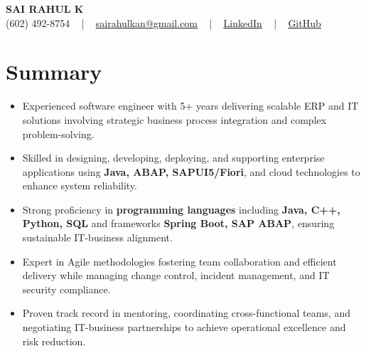\documentclass[letterpaper,11pt]{article}
\newcommand{\resumeItem}[1]{
  \item\footnotesize{
    {#1 \vspace{-2pt}}
  }
}
\newcommand{\resumeItemListStart}{\begin{itemize}[leftmargin=*]}
\newcommand{\resumeItemListEnd}{\end{itemize}\vspace{-5pt}}
\begin{document}
\begin{center}
    {\fontsize{14pt}{12pt}\selectfont \textbf{\MakeUppercase{Sai Rahul K}}}\\ \vspace{2pt}
    \fontsize{10pt}{12pt}\selectfont (602) 492-8754 ~ | ~ \href{mailto:sairahulkan@gmail.com}{sairahulkan@gmail.com} ~ | ~
    \href{https://www.linkedin.com/in/rq123/}{\color{blue}\underline{LinkedIn}} ~ | ~
    \href{https://github.com/kanrahuldo}{\color{blue}\underline{GitHub}}~
    \vspace{-8pt}
\end{center}

\section{Summary}
\fontsize{9pt}{10pt}\selectfont
\resumeItemListStart
    \resumeItem{Experienced software engineer with 5+ years delivering scalable ERP and IT solutions involving strategic business process integration and complex problem-solving.}
    \resumeItem{Skilled in designing, developing, deploying, and supporting enterprise applications using \textbf{Java, ABAP, SAPUI5/Fiori}, and cloud technologies to enhance system reliability.}
    \resumeItem{Strong proficiency in \textbf{programming languages} including \textbf{Java, C++, Python, SQL} and frameworks \textbf{Spring Boot, SAP ABAP}, ensuring sustainable IT-business alignment.}
    \resumeItem{Expert in Agile methodologies fostering team collaboration and efficient delivery while managing change control, incident management, and IT security compliance.}
    \resumeItem{Proven track record in mentoring, coordinating cross-functional teams, and negotiating IT-business partnerships to achieve operational excellence and risk reduction.}
\resumeItemListEnd
\vspace{-6pt}
\end{document}
